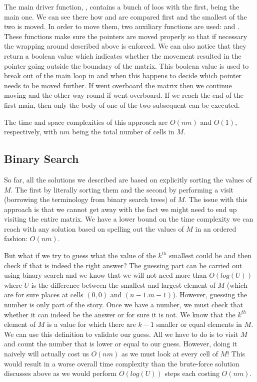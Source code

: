 The main driver function, , contains a bunch of loos with the first, being the main one. We can see there how  and  are compared first and the smallest of the two is moved. In order to move them, two auxiliary functions are used:  and . These functions make sure the pointers are moved properly so that if necessary the wrapping around described above is enforced. We can also notice that they return a boolean value which indicates whether the movement resulted in the pointer going outside the boundary of the matrix.
This boolean value is used to break out of the main loop in  and when this happens to decide which pointer needs to be moved further. If  went overboard the matrix then we continue moving  and the other way round if  went overboard. If we reach the end of the first main, then only the body of one of the two subsequent  can be executed.

The time and space complexities of this approach are $O(nm)$ and $O(1)$, respectively, with $nm$ being the total number of cells in $M$.

\subsection{Binary Search}
\label{kth_smallest_in_sorted_matrix:sec:binarysearch}
So far, all the solutions we described are based on explicitly sorting the values of $M$. The first by literally sorting them and the second by performing a  visit (borrowing the terminology from binary search trees) of $M$. The issue with this approach is that we cannot get away with the fact we might need to end up visiting the entire matrix. We have a lower bound on the time complexity we can reach with any solution based on spelling out the values of $M$ in an ordered fashion: $O(nm)$.

But what if we try to guess what the value of the $k^{th}$ smallest could be and then check if that is indeed the right answer? The guessing part can be carried out using binary search and we know that we will not need more than $O(log(U))$ where $U$ is the difference between the smallest and largest element of $M$ (which are for sure places at cells $(0,0)$ and $(n-1.m-1)$).
However, guessing the number is only part of the story. Once we have a number, we must check that whether it can indeed be the answer or for sure it is not. 
We know that the $k^{th}$ element of $M$ is a value for which there are $k-1$ smaller or equal elements in $M$. We can use this definition to validate our guess. All we have to do is to visit $M$ and count the number that is lower or equal to our guess. However, doing it naively will actually cost us $O(nm)$ as we must look at every cell of $M$! This would result in a worse overall time complexity than the brute-force solution discusses above as we would perform $O(log(U))$ steps each costing $O(nm)$.

